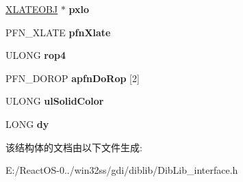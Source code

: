 \begin{DoxyCompactItemize}
\hyperlink{struct___x_l_a_t_e_o_b_j}{X\+L\+A\+T\+E\+O\+BJ} $\ast$ {\bfseries pxlo}
\item 
\mbox{\label{struct_b_l_t_d_a_t_a_a9e74286c50bcff5dc0c03212a7d2c1a6}} 
P\+F\+N\+\_\+\+X\+L\+A\+TE {\bfseries pfn\+Xlate}
\item 
\mbox{\label{struct_b_l_t_d_a_t_a_a85693a70f242c3e623105b1f833927de}} 
U\+L\+O\+NG {\bfseries rop4}
\item 
\mbox{\label{struct_b_l_t_d_a_t_a_a4c89b47f2b893448d6758ceb3456bd6a}} 
P\+F\+N\+\_\+\+D\+O\+R\+OP {\bfseries apfn\+Do\+Rop} \mbox{[}2\mbox{]}
\item 
\mbox{\label{struct_b_l_t_d_a_t_a_a3c572cbcd29b61fe04d53c0462dc15cc}} 
U\+L\+O\+NG {\bfseries ul\+Solid\+Color}
\item 
\mbox{\label{struct_b_l_t_d_a_t_a_a8b469419ebee768bc85ab43568ceaff1}} 
L\+O\+NG {\bfseries dy}
\end{DoxyCompactItemize}


该结构体的文档由以下文件生成\+:\begin{DoxyCompactItemize}
\item 
E\+:/\+React\+O\+S-\/0../win32ss/gdi/diblib/Dib\+Lib\+\_\+interface.\+h\end{DoxyCompactItemize}
